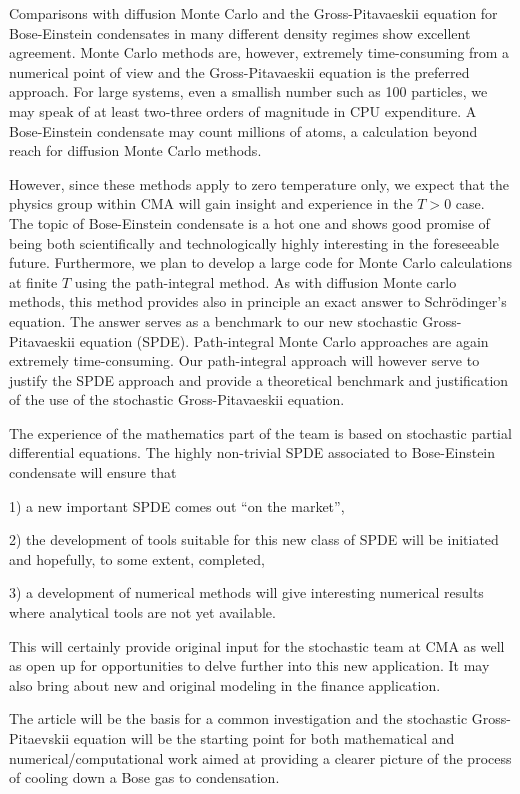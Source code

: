 \documentclass[a4paper,12pt,twoside]{article}
\begin{document}
Comparisons with diffusion Monte Carlo and the Gross-Pitavaeskii equation
for Bose-Einstein condensates in many different density regimes 
show excellent agreement. Monte Carlo methods are, however, extremely time-consuming
from a numerical point of view and the Gross-Pitavaeskii equation is the preferred approach.
For large systems,
even a smallish number such as  100 particles, we may speak of at least two-three orders of
magnitude in CPU expenditure.
A Bose-Einstein condensate may count millions of atoms, a calculation beyond reach for diffusion
Monte Carlo methods. 

However, since these methods apply to zero temperature only, 
we expect that the physics
group within CMA will gain insight and experience in the $T>0$ case. The topic of Bose-Einstein
condensate
is a hot one and shows good promise of being both scientifically and technologically
highly interesting  in the foreseeable
future. Furthermore, we plan to develop a large code for Monte Carlo calculations at finite $T$
using the path-integral method. As with diffusion Monte carlo methods, this method provides also in principle  an exact answer to Schr\"odinger's equation. The answer serves as a benchmark 
to our new stochastic Gross-Pitavaeskii equation (SPDE). 
Path-integral Monte Carlo approaches are again extremely time-consuming. Our path-integral  approach
will however serve to justify the SPDE approach and provide a theoretical benchmark and justification of 
the use of the stochastic Gross-Pitavaeskii equation. 

The experience of the mathematics part of the team is based on stochastic partial differential equations. The highly 
non-trivial SPDE associated to Bose-Einstein condensate will ensure that

1) a new important SPDE comes out ``on the market'',

2) the development of tools suitable for this new class of SPDE will be initiated and hopefully, to some extent, completed, 

3) a development of numerical methods will give interesting numerical results where analytical tools are not yet available.

This will certainly provide original input for the stochastic team at CMA as well as open up for opportunities to delve further 
into this new application. It may also bring about new and original modeling in the finance application.

The article \cite{GP} will be the basis for a common investigation and
the stochastic Gross-Pitaevskii equation will be the starting point for both mathematical and 
numerical/computational work aimed at providing a clearer picture of the process of cooling down a Bose gas to condensation.
\end{document}
